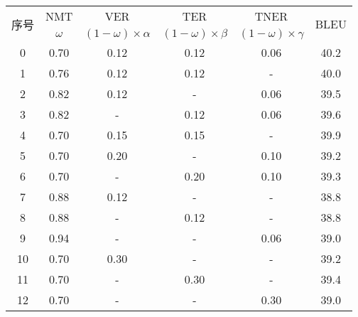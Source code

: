 
\begin{table}[!htbp]
    \label{tab:4_ablation_study}
    \centering
    \footnotesize%
    \setlength{\tabcolsep}{4pt}%
    \renewcommand{\arraystretch}{1.2}%
\begin{tabular}{cccccc}
\hline
\multirow{2}{*}{序号} & NMT & VER & TER & TNER & \multirow{2}{*}{BLEU} \\
\cline{2-5}
   & $\omega$ & $(1-\omega) \times \alpha$ & $(1-\omega) \times \beta$ & $(1-\omega) \times \gamma$ & \\
\hline
0  & 0.70 & 0.12 & 0.12 & 0.06 & 40.2 \\
\hline
1  & 0.76 & 0.12 & 0.12 &  -   & 40.0 \\
2  & 0.82 & 0.12 & -    & 0.06 & 39.5 \\
3  & 0.82 & -    & 0.12 & 0.06 & 39.6 \\
\hline
4  & 0.70 & 0.15 & 0.15 & -    & 39.9 \\
5  & 0.70 & 0.20 & -    & 0.10 & 39.2 \\
6  & 0.70 & -    & 0.20 & 0.10 & 39.3 \\
\hline
7  & 0.88 & 0.12 & -    & -    & 38.8 \\
8  & 0.88 & -    & 0.12 & -    & 38.8 \\
9  & 0.94 & -    & -    & 0.06 & 39.0 \\
\hline
10 & 0.70 & 0.30 & -    & -    & 39.2 \\
11 & 0.70 & -    & 0.30 & -    & 39.4 \\
12 & 0.70 & -    & -    & 0.30 & 39.0 \\
\hline
\end{tabular}
\end{table}